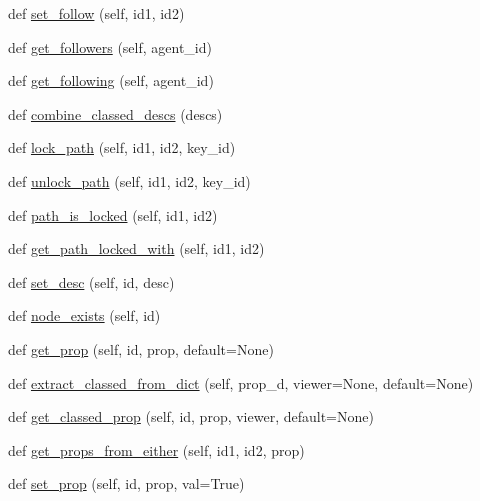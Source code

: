 \begin{DoxyCompactItemize}
\item 
def \hyperlink{classlight__chats_1_1graph_1_1Graph_a729d07bc1da395a60d3431cec5bb439b}{set\+\_\+follow} (self, id1, id2)
\item 
def \hyperlink{classlight__chats_1_1graph_1_1Graph_add43b11ac4acd2b8db044599c492564a}{get\+\_\+followers} (self, agent\+\_\+id)
\item 
def \hyperlink{classlight__chats_1_1graph_1_1Graph_a1f4c0ccc957a89dcec003a73553914b7}{get\+\_\+following} (self, agent\+\_\+id)
\item 
def \hyperlink{classlight__chats_1_1graph_1_1Graph_a96afb6e22927414bb55693609a5e89cb}{combine\+\_\+classed\+\_\+descs} (descs)
\item 
def \hyperlink{classlight__chats_1_1graph_1_1Graph_a1e8203ba71f1edd33e989ba4a72d8533}{lock\+\_\+path} (self, id1, id2, key\+\_\+id)
\item 
def \hyperlink{classlight__chats_1_1graph_1_1Graph_a7a4820f5a9eff4261a81df8537937ac1}{unlock\+\_\+path} (self, id1, id2, key\+\_\+id)
\item 
def \hyperlink{classlight__chats_1_1graph_1_1Graph_aeeb122366f2f098d889309fa53d19917}{path\+\_\+is\+\_\+locked} (self, id1, id2)
\item 
def \hyperlink{classlight__chats_1_1graph_1_1Graph_af857c9968c7787d742ac731d1cd7cb2c}{get\+\_\+path\+\_\+locked\+\_\+with} (self, id1, id2)
\item 
def \hyperlink{classlight__chats_1_1graph_1_1Graph_a6039eea576e68156be7fcaa7a3929358}{set\+\_\+desc} (self, id, desc)
\item 
def \hyperlink{classlight__chats_1_1graph_1_1Graph_ab0dd6685d8eb353d76eca8de20a39914}{node\+\_\+exists} (self, id)
\item 
def \hyperlink{classlight__chats_1_1graph_1_1Graph_a30483d3bbb88924bb7b98fb72b2e23fe}{get\+\_\+prop} (self, id, prop, default=None)
\item 
def \hyperlink{classlight__chats_1_1graph_1_1Graph_a4b2f6d6d7714ea3b82ff7a01f3199123}{extract\+\_\+classed\+\_\+from\+\_\+dict} (self, prop\+\_\+d, viewer=None, default=None)
\item 
def \hyperlink{classlight__chats_1_1graph_1_1Graph_a33e205ecb0e7d4d2626162250ef585f1}{get\+\_\+classed\+\_\+prop} (self, id, prop, viewer, default=None)
\item 
def \hyperlink{classlight__chats_1_1graph_1_1Graph_ad12090e48ff11063ece35c115b91d2aa}{get\+\_\+props\+\_\+from\+\_\+either} (self, id1, id2, prop)
\item 
def \hyperlink{classlight__chats_1_1graph_1_1Graph_ae2c69adb1ea1477aaa6d9af693b30fa1}{set\+\_\+prop} (self, id, prop, val=True)

\end{DoxyCompactItemize}
